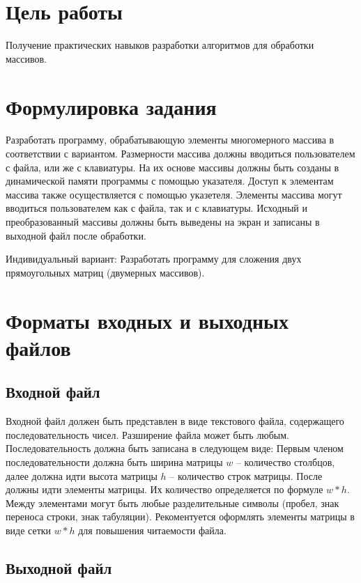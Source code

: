 \documentclass[12pt,a4paper]{article}  %
\begin{document}
	\section*{Цель работы}
	
	Получение практических навыков разработки алгоритмов для обработки
	массивов.
	
	\section*{Формулировка задания}
	
	Разработать программу, обрабатывающую элементы многомерного
	массива в соответствии с вариантом.
	Размерности массива должны вводиться пользователем с файла, или же
	с клавиатуры.
	На их основе массивы должны быть созданы в динамической
	памяти программы с помощью указателя.
	Доступ к элементам массива также осуществляется с помощью указетеля.
	Элементы массива могут вводиться пользователем как с файла, так и с
	клавиатуры.
	Исходный и преобразованный массивы должны быть выведены на экран
	и записаны в выходной файл после обработки.
	
	Индивидуальный вариант: Разработать программу для сложения двух 
	прямоугольных матриц (двумерных массивов).
	
	\newpage
	\section*{Форматы входных и выходных файлов}
	
	\subsection*{Входной файл}
	
	Входной файл должен быть представлен в виде текстового файла, содержащего последовательность чисел.
	Разширение файла может быть любым.
	Последовательность должна быть записана в следующем виде:
	Первым членом последовательности должна быть ширина матрицы $ w $ -- количество столбцов,
	далее должна идти высота матрицы $ h $ -- количество строк матрицы.
	После должны идти элементы матрицы.
	Их количество определяется по формуле $ w*h $.
	Между элементами могут быть любые разделительные символы
	(пробел, знак переноса строки, знак табуляции).
	Рекоментуется оформлять элементы
	матрицы в виде сетки $ w*h $ для повышения читаемости файла.
	
	\subsection*{Выходной файл}
	
\end{document}
